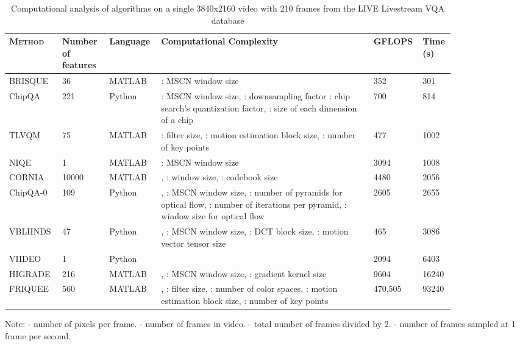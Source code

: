 \documentclass[journal]{IEEEtran}
\begin{document}
\begin{table*}[!h]
\centering
\caption{Computational analysis of algorithms on a single 3840x2160 video with 210 frames from the LIVE Livestream VQA database}
\begin{threeparttable}
\begin{tabular}{|p{0.1\linewidth}|p{0.1\linewidth}|p{0.1\linewidth}|p{0.45\linewidth}|p{0.05\linewidth}|p{0.05\linewidth}|}
\hline
\textsc{Method}  & Number of features & Language & Computational Complexity & GFLOPS & Time (s) \\
\hline
BRISQUE\cite{brisque} & 36 & MATLAB &  : MSCN window size & 352 &  301 \\
\hline
ChipQA & 221 & Python &  : MSCN window size, : downsampling factor : chip search's quantization factor, : size of each dimension of a chip  & 700 & 814  \\
\hline
TLVQM\cite{tlvqm} & 75 & MATLAB &   : filter size, : motion estimation block size, : number of key points & 477 & 1002 \\
\hline
NIQE\cite{niqe} & 1 & MATLAB &  : MSCN window size & 3094 &  1008 \\
\hline
CORNIA\cite{cornia} & 10000 & MATLAB & ,  : window size, : codebook size & 4480 & 2056\\
\hline
ChipQA-0\cite{chipqa0} & 109 & Python & ,  : MSCN window size, : number of pyramids for optical flow, : number of iterations per pyramid, : window size for optical flow & 2605 & 2655  \\
\hline
VBLIINDS\cite{vbliinds} & 47 & Python & , : MSCN window size, : DCT block size, : motion vector tensor size & 465 &  3086 \\
\hline
VIIDEO\cite{viideo} & 1 & Python &  & 2094 & 6403 \\
\hline
HIGRADE\cite{higrade} & 216 & MATLAB & , : MSCN window size, : gradient kernel size & 9604 & 16240 \\
\hline
FRIQUEE\cite{friquee} & 560 & MATLAB & , : filter size, : number of color spaces, : motion estimation block size, : number of key points & 470,505 & 93240\\
\hline
\end{tabular}
    \begin{tablenotes}
      \small
      \item *Note:  - number of pixels per frame.  - number of frames in video.  - total number of frames divided by 2.  - number of frames sampled at 1 frame per second.
    \end{tablenotes}
 \end{threeparttable}
\label{tab:compcost}
\end{table*}
\end{document}
